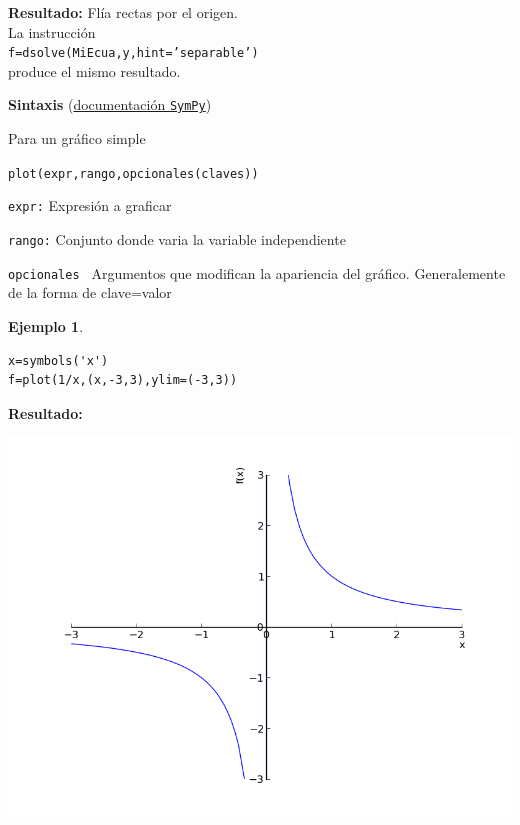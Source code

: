 \documentclass{article}
\newtheorem{ejemplo}{Ejemplo}}
\begin{document}
\noindent\textbf{Resultado:}
Flía rectas  por el origen. \\
La instrucción\\
\texttt{f=dsolve(MiEcua,y,hint='separable')}
\\produce el mismo resultado.






\begin{codigo}

\textbf{Sintaxis} (\href{http://docs.sympy.org/latest/modules/plotting.html}{documentación \texttt{SymPy}})

Para un gráfico simple

\texttt{plot(expr,rango,opcionales(claves))}

\texttt{expr:} Expresión a graficar 

\texttt{rango:} Conjunto donde varia la variable independiente 

\texttt{opcionales } Argumentos que modifican la apariencia del gráfico. Generalemente de la forma de clave=valor

\end{codigo}


\begin{ejemplo}

\end{ejemplo}


\begin{lstlisting}
x=symbols('x')
f=plot(1/x,(x,-3,3),ylim=(-3,3))
\end{lstlisting}

\noindent\textbf{Resultado:}
\begin{center}
\includegraphics[scale=.35]{imagenes/ejemplo_plot.png}
\end{center}
\end{document}
